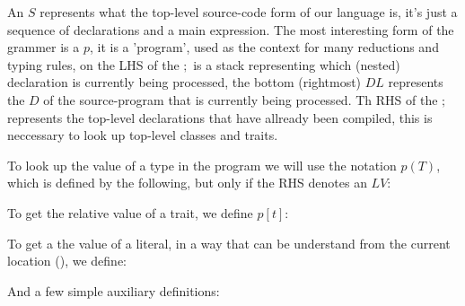 An $S$ represents what the top-level source-code form of our language is, it’s just a sequence of declarations and a main expression.
The most interesting form of the grammer is a $p$, it is a ’program’, used as the context for many reductions and typing rules, on the LHS of the $;$ is a stack representing which (nested) declaration is currently being processed, the bottom (rightmost) $DL$ represents the $D$ of the source-program that is currently being processed. Th RHS of the $;$ represents the top-level declarations that have allready been compiled, this is neccessary to look up top-level classes and traits.

\noindent To look up the value of a type in the program we will use the notation $p(T)$, which is defined by the following, but only if the RHS denotes an $LV$:
\begin{defye}%
%
%
%
\end{defye}

\noindent To get the relative value of a trait, we define $p[t]$:
\begin{defye}%
\end{defye}

\noindent To get a the value of a literal, in a way that can be understand from the current location (), we define:
\begin{defye}%
\end{defye}

\noindent And a few simple auxiliary definitions:
\begin{defye}%
\end{defye}

\newpage

